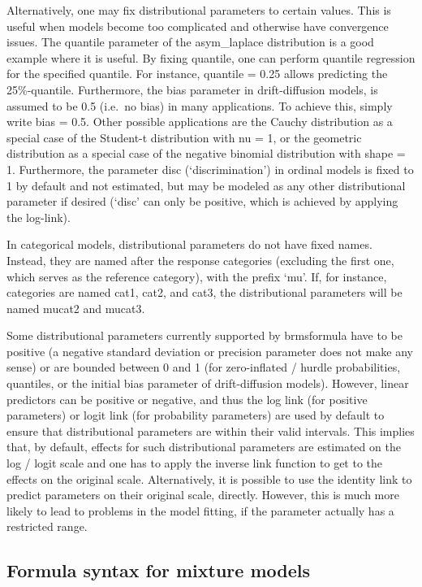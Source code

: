 \documentclass[]{book}
\begin{document}
Alternatively, one may fix distributional parameters to certain values. This is useful when models become too complicated and otherwise have convergence issues. The quantile parameter of the asym\_laplace distribution is a good example where it is useful. By fixing quantile, one can perform quantile regression for the specified quantile. For instance, quantile = 0.25 allows predicting the 25\%-quantile. Furthermore, the bias parameter in drift-diffusion models, is assumed to be 0.5 (i.e.~no bias) in many applications. To achieve this, simply write bias = 0.5. Other possible applications are the Cauchy distribution as a special case of the Student-t distribution with nu = 1, or the geometric distribution as a special case of the negative binomial distribution with shape = 1. Furthermore, the parameter disc (`discrimination') in ordinal models is fixed to 1 by default and not estimated, but may be modeled as any other distributional parameter if desired (`disc' can only be positive, which is achieved by applying the log-link).

In categorical models, distributional parameters do not have fixed names. Instead, they are named after the response categories (excluding the first one, which serves as the reference category), with the prefix `mu'. If, for instance, categories are named cat1, cat2, and cat3, the distributional parameters will be named mucat2 and mucat3.

Some distributional parameters currently supported by brmsformula have to be positive (a negative standard deviation or precision parameter does not make any sense) or are bounded between 0 and 1 (for zero-inflated / hurdle probabilities, quantiles, or the initial bias parameter of drift-diffusion models). However, linear predictors can be positive or negative, and thus the log link (for positive parameters) or logit link (for probability parameters) are used by default to ensure that distributional parameters are within their valid intervals. This implies that, by default, effects for such distributional parameters are estimated on the log / logit scale and one has to apply the inverse link function to get to the effects on the original scale. Alternatively, it is possible to use the identity link to predict parameters on their original scale, directly. However, this is much more likely to lead to problems in the model fitting, if the parameter actually has a restricted range.

\hypertarget{formula-syntax-for-mixture-models}{%
\subsection{Formula syntax for mixture models}\label{formula-syntax-for-mixture-models}}
\end{document}
